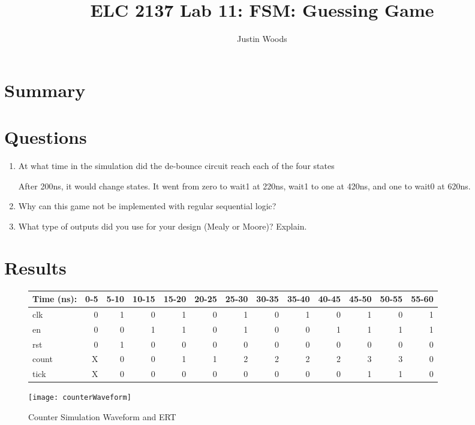 \documentclass[11pt]{article}
\begin{document}
\title{ELC 2137 Lab 11: FSM: Guessing Game}
\author{Justin Woods}
\maketitle

\section*{Summary}

\section*{Questions}

\begin{enumerate}
	\item At what time in the simulation did the de-bounce circuit reach each of the four states
	
	After 200ns, it would change states. It went from zero to wait1 at 220ns, wait1 to one at 420ns, and one to wait0 at 620ns.
	
	\item Why  can  this  game  not  be  implemented with regular sequential logic?

	\item What type of outputs did you use for your design (Mealy or Moore)?  Explain.
	

\end{enumerate}
\clearpage
\section*{Results}

\begin{figure}[ht]\centering
	
	\begin{tabular}{l|rrrrrrrrrrrr}	
		Time (ns): & 0-5 & 5-10 & 10-15 & 15-20 & 20-25 & 25-30 & 30-35 & 35-40 & 40-45 & 45-50 & 50-55 & 55-60 \\
		\midrule
		clk     & 0 & 1 & 0 & 1 & 0 & 1 & 0 & 1 & 0 & 1 & 0 & 1\\
		en  	& 0 & 0 & 1 & 1 & 0 & 1 & 0 & 0 & 1 & 1 & 1 & 1\\
		rst 	& 0 & 1 & 0 & 0 & 0	& 0 & 0 & 0 & 0	& 0 & 0 & 0\\
		\midrule
		count 	& X & 0 & 0 & 1 & 1 & 2 & 2	& 2 & 2 & 3 & 3 & 0 \\
		tick	& X & 0 & 0 & 0 & 0 & 0 & 0	& 0 & 0 & 1 & 1 & 0 \\
		\bottomrule
	\end{tabular}
	\bigskip
	\texttt{[image: counterWaveform]}
	\caption{Counter Simulation Waveform and ERT}
	\label{fig:sim_with_table}
\end{figure}
\end{document}
